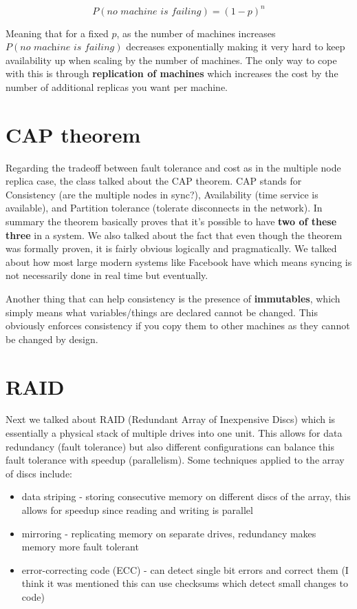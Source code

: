 \documentclass[twoside]{article}
\begin{document}
\begin{equation}
    P(\textit{no machine is failing}) = (1-p)^n
\end{equation}

Meaning that for a fixed $p$, as the number of machines increases $P(\textit{no machine is failing})$ decreases exponentially making it very hard to keep availability up when scaling by the number of machines. The only way to cope with this is through \textbf{replication of machines} which increases the cost by the number of additional replicas you want per machine.

\section{CAP theorem}

Regarding the tradeoff between fault tolerance and cost as in the multiple node replica case, the class talked about the CAP theorem. CAP stands for Consistency (are the multiple nodes in sync?), Availability (time service is available), and Partition tolerance (tolerate disconnects in the network). In summary the theorem basically proves that it's possible to have \textbf{two of these three} in a system. We also talked about the fact that even though the theorem was formally proven, it is fairly obvious logically and pragmatically. We talked about how most large modern systems like Facebook have  which means syncing is not necessarily done in real time but eventually.

Another thing that can help consistency is the presence of \textbf{immutables}, which simply means what variables/things are declared cannot be changed. This obviously enforces consistency if you copy them to other machines as they cannot be changed by design.

\section{RAID}

Next we talked about RAID (Redundant Array of Inexpensive Discs) which is essentially a physical stack of multiple drives into one unit. This allows for data redundancy (fault tolerance) but also different configurations can balance this fault tolerance with speedup (parallelism). Some techniques applied to the array of discs include:

\begin{itemize}
    \item data striping - storing consecutive memory on different discs of the array, this allows for speedup since reading and writing is parallel
    \item mirroring - replicating memory on separate drives, redundancy makes memory more fault tolerant
    \item error-correcting code (ECC) - can detect single bit errors and correct them (I think it was mentioned this can use checksums which detect small changes to code)
\end{itemize}
\end{document}
